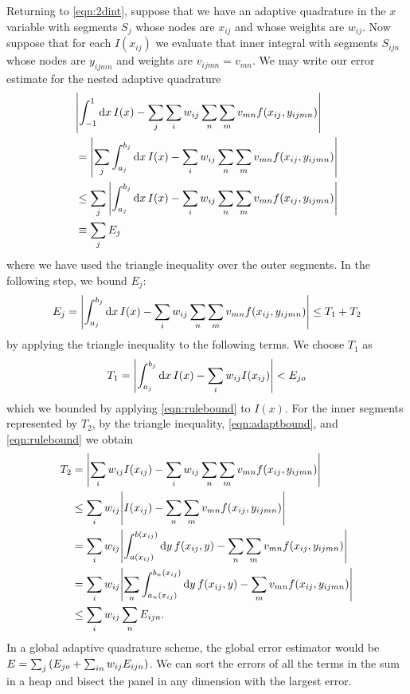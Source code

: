 \documentclass{article}
\begin{document}
Returning to \eqref{eqn:2dint}, suppose that we have an adaptive quadrature in
the $x$ variable with segments $S_j$ whose nodes are $x_{ij}$ and whose weights
are $w_{ij}$. Now suppose that for each $I(x_{ij})$ we evaluate that inner
integral with segments $S_{ijn}$ whose nodes are $y_{ijmn}$ and weights are
$v_{ijmn}=v_{mn}$. We may write our error estimate for the nested adaptive quadrature
\begin{align}
    &\abs{\int_{-1}^{1} \dd{x} I(x) - \sum_{j} \sum_{i} w_{ij} \sum_{n} \sum_{m} v_{mn} f(x_{ij},y_{ijmn})}
\\  &= \abs{\sum_{j} \int_{a_j}^{b_j} \dd{x} I(x) - \sum_{i} w_{ij} \sum_{n} \sum_{m} v_{mn} f(x_{ij},y_{ijmn})}
\\  &\leq \sum_{j} \abs{\int_{a_j}^{b_j} \dd{x} I(x) - \sum_{i} w_{ij} \sum_{n} \sum_{m} v_{mn} f(x_{ij},y_{ijmn})}
\\  &\equiv \sum_{j} E_j
\end{align}
where we have used the triangle inequality over the outer segments. In the
following step, we bound $E_j$:
\begin{align}
    E_j
    = \abs{\int_{a_j}^{b_j} \dd{x} I(x) - \sum_{i} w_{ij} \sum_{n} \sum_{m} v_{mn} f(x_{ij},y_{ijmn})}
    \leq T_1 + T_2
\end{align}
by applying the triangle inequality to the following terms. We choose $T_1$ as
\begin{align}
    T_1 = \abs{\int_{a_j}^{b_j} \dd{x} I(x) - \sum_{i} w_{ij} I(x_{ij})} < E_{jo}
\end{align}
which we bounded by applying \eqref{eqn:rulebound} to $I(x)$. For the inner
segments represented by $T_2$, by the triangle inequality,
\eqref{eqn:adaptbound}, and \eqref{eqn:rulebound} we obtain
\begin{align}
    T_2 &= \abs{\sum_{i} w_{ij} I(x_{ij}) - \sum_{i} w_{ij} \sum_{n} \sum_{m} v_{mn} f(x_{ij},y_{ijmn})}
\\  &\leq \sum_{i} w_{ij} \abs{I(x_{ij}) - \sum_{n} \sum_{m} v_{mn} f(x_{ij},y_{ijmn})}
\\  &= \sum_{i} w_{ij} \abs{\int_{a(x_{ij})}^{b(x_{ij})} \dd{y} f(x_{ij}, y) - \sum_{n} \sum_{m} v_{mn} f(x_{ij},y_{ijmn})}
\\  &= \sum_{i} w_{ij} \abs{\sum_{n} \int_{a_n(x_{ij})}^{b_n(x_{ij})} \dd{y} f(x_{ij}, y) - \sum_{m} v_{mn} f(x_{ij},y_{ijmn})}
\\  &\leq \sum_{i} w_{ij} \sum_{n} E_{ijn}.
\end{align}
In a global adaptive quadrature scheme, the global error estimator would be $E =
\sum_{j} \qty(E_{jo} + \sum_{in} w_{ij} E_{ijn})$. We can sort the errors of all
the terms in the sum in a heap and bisect the panel in any dimension with the
largest error.
\end{document}
